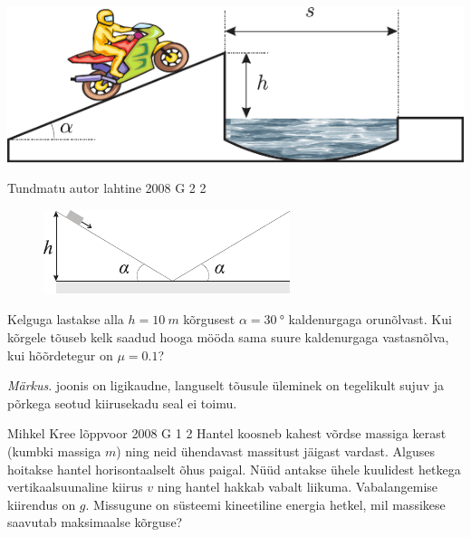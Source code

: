 \documentclass[11pt]{article}
\begin{document}
{{\begin{center}
	\includegraphics[width=0.8\linewidth]{2007-lahg-05-yl}
\end{center}
\fi
}
\newpage


{Tundmatu autor} %
{lahtine} %
{2008} %
{G 2} %
{2} %
{
\ifStatement
\begin{figure}
	\begin{center}
		\vspace{-20pt}
		\hspace{-10pt}
		\includegraphics[width=\linewidth]{2008-lahg-02-yl}
	\end{center}
\end{figure}
Kelguga lastakse alla $h = \SI{10}{m}$ kõrgusest $\alpha = \SI{30}{\degree}$ kaldenurgaga orunõlvast. Kui kõrgele tõuseb kelk saadud hooga mööda sama suure kaldenurgaga vastasnõlva, kui hõõrdetegur on $\mu = \num{0,1}$? 

\emph{Märkus}. joonis on ligikaudne, languselt tõusule üleminek on tegelikult sujuv ja põrkega seotud kiirusekadu seal ei toimu.
\fi
}

{Mihkel Kree} %
{lõppvoor} %
{2008} %
{G 1} %
{2} %
{
\ifStatement
Hantel koosneb kahest võrdse massiga kerast (kumbki massiga $m$) ning neid ühendavast massitust jäigast vardast. Alguses hoitakse hantel horisontaalselt õhus paigal. Nüüd antakse ühele kuulidest hetkega vertikaalsuunaline kiirus $v$ ning hantel hakkab vabalt liikuma. Vabalangemise kiirendus on $g$. Missugune on süsteemi kineetiline energia hetkel, mil massikese saavutab maksimaalse kõrguse?
\fi
}

}
\end{document}
